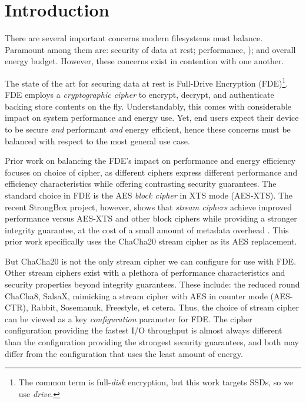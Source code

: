 \section{Introduction}\label{sec:introduction}

There are several important concerns modern filesystems must balance.
Paramount among them are: security of data at rest; performance, ); and overall energy budget. However, these concerns exist in
contention with one another. 

The state of the art for securing data at rest is Full-Drive Encryption
(FDE)\footnote{The common term is full-\emph{disk} encryption, but this work
targets SSDs, so we use \emph{drive}.}. FDE employs a \emph{cryptographic
cipher} to encrypt, decrypt, and authenticate backing store contents on the fly.
Understandably, this comes with considerable impact on system performance and
energy use.  Yet, end users expect their device to be secure
\emph{and} performant \emph{and} energy efficient, hence these concerns must be
balanced with respect to the most general use case.

Prior work on balancing the FDE's impact on performance and energy efficiency
focuses on choice of cipher, as different ciphers express different performance
and efficiency characteristics while offering contrasting security guarantees. 
The standard choice in FDE is the AES \emph{block cipher} in XTS
mode (AES-XTS). The recent StrongBox project, however, shows that \emph{stream ciphers} achieve
improved performance versus AES-XTS and other block ciphers while providing a
stronger integrity guarantee, at the cost of a small amount of metadata overhead \cite{StrongBox}. This prior work specifically uses 
the ChaCha20 stream cipher\cite{ChaCha20} as its AES replacement.

But ChaCha20 is not the only stream cipher we can configure for use with FDE.
Other stream ciphers exist with a plethora of performance
characteristics and security properties beyond integrity guarantees. These
include: the reduced round ChaCha8\cite{ChaCha8}, SalsaX\cite{SalsaX}, mimicking
a stream cipher with AES in counter mode (AES-CTR)\cite{AES-CTR},
Rabbit\cite{Rabbit}, Sosemanuk\cite{Sosemanuk}, Freestyle\cite{Freestyle}, et
cetera. Thus, the choice of stream cipher can be viewed as a key \emph{configuration} parameter for FDE.  
The cipher configuration providing the fastest I/O throughput is almost always
different than the configuration providing the strongest security guarantees,
and both may differ from the configuration that uses the least amount of energy.

